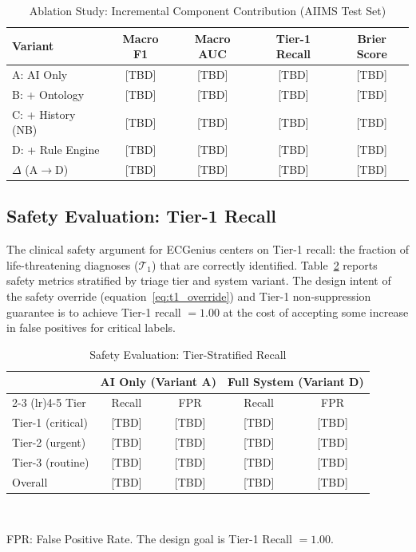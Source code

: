 \documentclass[journal]{IEEEtran}
\begin{document}
\begin{table}[!t]
\centering
\caption{Ablation Study: Incremental Component Contribution
         (AIIMS Test Set)}
\label{tab:ablation}
\setlength{\tabcolsep}{3pt}
\begin{tabular}{@{}lcccc@{}}
  \toprule
  Variant & Macro F1 & Macro AUC & Tier-1 Recall & Brier Score \\
  \midrule
  A: AI Only            & [TBD] & [TBD] & [TBD] & [TBD] \\
  B: + Ontology         & [TBD] & [TBD] & [TBD] & [TBD] \\
  C: + History (NB)     & [TBD] & [TBD] & [TBD] & [TBD] \\
  D: + Rule Engine      & [TBD] & [TBD] & [TBD] & [TBD] \\
  \midrule
  $\Delta$ (A$\to$D)    & [TBD] & [TBD] & [TBD] & [TBD] \\
  \bottomrule
\end{tabular}
\end{table}

\subsection{Safety Evaluation: Tier-1 Recall}

The clinical safety argument for ECGenius centers on Tier-1 recall:
the fraction of life-threatening diagnoses ($\mathcal{T}_1$) that
are correctly identified.
Table~\ref{tab:safety} reports safety metrics stratified by triage
tier and system variant.
The design intent of the safety override
(equation~\ref{eq:t1_override}) and Tier-1 non-suppression guarantee
is to achieve Tier-1 recall $= 1.00$ at the cost of accepting
some increase in false positives for critical labels.

\begin{table}[!t]
\centering
\caption{Safety Evaluation: Tier-Stratified Recall}
\label{tab:safety}
\begin{tabular}{@{}lcccc@{}}
  \toprule
  & \multicolumn{2}{c}{AI Only (Variant A)} &
    \multicolumn{2}{c}{Full System (Variant D)} \\
  \cmidrule(lr){2-3} \cmidrule(lr){4-5}
  Tier & Recall & FPR & Recall & FPR \\
  \midrule
  Tier-1 (critical)  & [TBD] & [TBD] & [TBD] & [TBD] \\
  Tier-2 (urgent)    & [TBD] & [TBD] & [TBD] & [TBD] \\
  Tier-3 (routine)   & [TBD] & [TBD] & [TBD] & [TBD] \\
  \midrule
  Overall            & [TBD] & [TBD] & [TBD] & [TBD] \\
  \bottomrule
\end{tabular}\\[2pt]
\raggedright\footnotesize
FPR: False Positive Rate. The design goal is Tier-1 Recall $= 1.00$.
\end{table}
\end{document}
